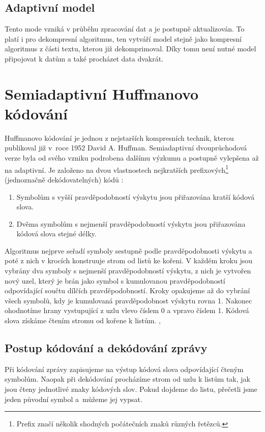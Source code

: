 \subsection{Adaptivní model}
Tento mode vzniká v průběhu zpracování dat a je postupně aktualizován. To platí i pro dekompresní algoritmus, ten vytváří model stejně jako kompresní algoritmus z části textu, kterou již dekomprimoval. Díky tomu není nutné model připojovat k datům a také procházet data dvakrát.

\section{Semiadaptivní Huffmanovo kódování}
\label{huffmanovoKodovani}
Huffmanovo kódování je jednou z nejstarších kompresních technik, kterou publikoval již v~roce 1952 David A. Huffman. Semiadaptivní dvouprůchodová verze byla od svého vzniku podrobena dalšímu výzkumu a postupně vylepšena až na adaptivní. Je založeno na dvou vlastnostech nejkratších prefixových\footnote{Prefix značí několik shodných počátečních znaků různých řetězců.} (jednoznačně dekódovatelných) kódů \cite{introductionToDataCompression}:

\begin{enumerate}
\item Symbolům s vyšší pravděpodobností výskytu jsou přiřazována kratší kódová slova.
\item Dvěma symbolům s nejmenší pravděpodobností výskytu jsou přiřazována kódová slova stejné délky.
\end{enumerate}

Algoritmus nejprve seřadí symboly sestupně podle pravděpodobnosti výskytu a poté z nich v krocích konstruuje strom od listů ke kořeni. V každém kroku jsou vybrány dva symboly s nejmenší pravděpodobností výskytu, z nich je vytvořen nový uzel, který je brán jako symbol s kumulovanou pravděpodobností odpovídající součtu dílčích pravděpodobností. Kroky opakujeme až do vybrání všech symbolů, kdy je kumulovaná pravděpodobnost výskytu rovna 1. Nakonec ohodnotíme hrany vystupující z uzlu vlevo číslem 0 a vpravo číslem 1. Kódová slova získáme čtením stromu od kořene k listům. \cite{dataCompression}, \cite{introductionToDataCompression}

\subsection{Postup kódování a dekódování zprávy}
Při kódování zprávy zapisujeme na výstup kódová slova odpovídající čteným symbolům. Naopak při dekódování procházíme strom od uzlu k listům tak, jak jsou čteny jednotlivé znaky kódových slov. Pokud dojdeme do listu, přečetli jsme jeden původní symbol a~můžeme jej vypsat.


